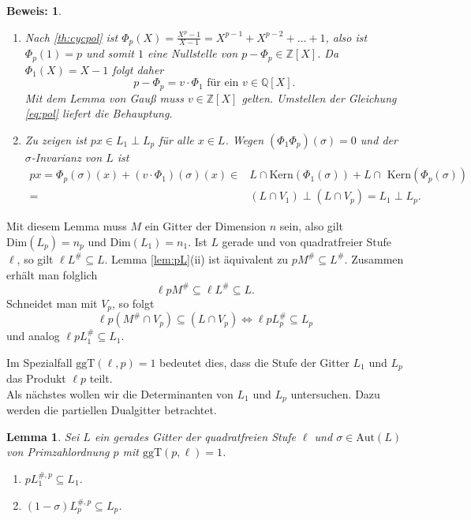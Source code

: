 \documentclass[12pt,a4paper,halfparskip,headsepline,bibtotocnumbered]{scrreprt}
\theoremstyle{nummermitklammern}
\newtheorem{lemma}[defsatzusw]{Lemma}
\theoremstyle{nonumberbreak}
\newtheorem{beweis}{Beweis:}
\newcommand{\Z}{\mathbb{Z}}
\newcommand{\Q}{\mathbb{Q}}
\newcommand{\Kern}{\text{Kern}}
\newcommand{\ggT}{\text{ggT}}
\newcommand{\Aut}{\text{Aut}}
\begin{document}
\begin{beweis}
	\begin{enumerate}[label=(\roman*)]
		\item Nach \eqref{th:cycpol} ist $\Phi_p(X) = \frac{X^p-1}{X-1} = X^{p-1} + X^{p-2} + \dots + 1$, also ist $\Phi_p(1) = p$ und somit $1$ eine Nullstelle von $p - \Phi_p \in \Z\left[ X \right]$. Da $\Phi_1(X) = X-1$ folgt daher 
			\begin{equation}\label{eq:pol}
				p - \Phi_p = v \cdot\Phi_1 \text{ für ein } v \in \Q\left[X\right].
			\end{equation}
			Mit dem Lemma von Gauß muss $v \in \Z \left[ X \right]$ gelten. Umstellen der Gleichung \eqref{eq:pol} liefert die Behauptung.
		\item Zu zeigen ist $p x \in L_1 \perp L_p$ für alle $x \in L$. Wegen $(\Phi_1 \Phi_p)(\sigma) = 0$ und der $\sigma$-Invarianz von $L$ ist
			\begin{align*}
				px = \Phi_p(\sigma)(x) + (v \cdot \Phi_1)(\sigma)(x) \in & L \cap \Kern(\Phi_1(\sigma)) + L \cap\text{ Kern}(\Phi_p(\sigma))\\
				=& (L \cap V_1) \perp (L \cap V_p) = L_1 \perp L_p.
			\end{align*}
	\end{enumerate}
\end{beweis}

Mit diesem Lemma muss $M$ ein Gitter der Dimension $n$ sein, also gilt $\text{Dim}(L_p) = n_p$ und $\text{Dim}(L_1) = n_1$. Ist $L$ gerade und von quadratfreier Stufe $\ell$, so gilt $\ell L^\# \subseteq L$. Lemma \eqref{lem:pL}(ii) ist äquivalent zu $p M^\# \subseteq L^\#$. Zusammen erhält man folglich
\begin{equation*}
	\ell p M^\# \subseteq \ell L^\# \subseteq L.
\end{equation*}
Schneidet man mit $V_p$, so folgt
\begin{equation*}
	\ell p (M^\# \cap V_p) \subseteq (L \cap V_p) \Leftrightarrow \ell p L_p^\# \subseteq L_p
\end{equation*}
und analog $\ell p L_1^\# \subseteq L_1$.

Im Spezialfall $\ggT(\ell, p) = 1$ bedeutet dies, dass die Stufe der Gitter $L_1$ und $L_p$ das Produkt $\ell p$ teilt.\\
Als nächstes wollen wir die Determinanten von $L_1$ und $L_p$ untersuchen. Dazu werden die partiellen Dualgitter betrachtet.

\begin{framed}
	\begin{lemma}\label{lem:fpinc}
		Sei $L$ ein gerades Gitter der quadratfreien Stufe $\ell$ und $\sigma \in \Aut(L)$ von Primzahlordnung $p$ mit $\ggT(p, \ell) = 1$.
		\begin{enumerate}[label=(\roman*)]
			\item $p L_1^{\#,p} \subseteq L_1$.
			\item $(1 - \sigma)L_p^{\#,p} \subseteq L_p$.
		\end{enumerate}
	\end{lemma}
\end{framed}
\end{document}
